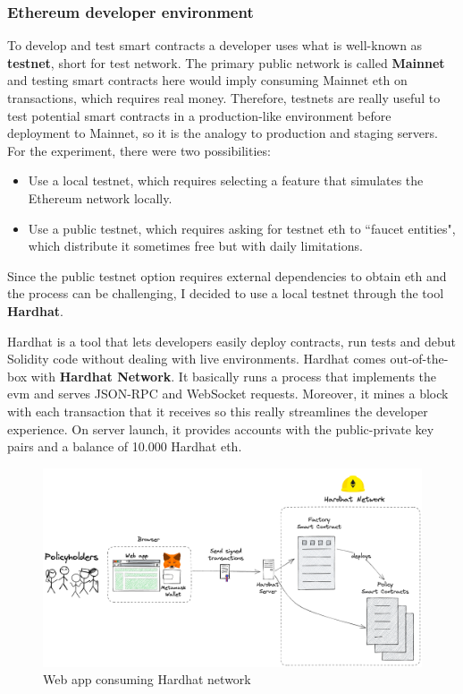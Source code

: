 \subsubsection{Ethereum developer environment}
{
To develop and test smart contracts a developer uses what is well-known as \textbf{testnet}, short for test network. The primary public network is called \textbf{Mainnet} and testing smart contracts here would imply consuming Mainnet \acrshort{eth} on transactions, which requires real money. Therefore, testnets are really useful to test potential smart contracts in a production-like environment before deployment to Mainnet, so it is the analogy to production and staging servers. For the experiment, there were two possibilities:
\begin{itemize}
    \item Use a local testnet, which requires selecting a feature that simulates the Ethereum network locally.
    \item Use a public testnet, which requires asking for testnet \acrshort{eth} to ``faucet entities", which distribute it sometimes free but with daily limitations. 
\end{itemize}

Since the public testnet option requires external dependencies to obtain \acrshort{eth} and the process can be challenging, I decided to use a local testnet through the tool \textbf{Hardhat}.

Hardhat is a tool that lets developers easily deploy contracts, run tests and debut Solidity code without dealing with live environments. Hardhat comes out-of-the-box with \textbf{Hardhat Network}\cite{hardhat_network}. It basically runs a process that implements the \acrshort{evm} and serves JSON-RPC and WebSocket requests. Moreover, it mines a block with each transaction that it receives so this really streamlines the developer experience. On server launch, it provides accounts with the public-private key pairs and a balance of 10.000 Hardhat \acrshort{eth}.

\begin{figure}[H]
\centering
\includegraphics[width=14cm]{img/project-development/hardhat.png}
\caption[Web app consuming Hardhat network]{\footnotesize{Web app consuming Hardhat network}}
\label{fig:hardhat-network}
\end{figure}

}
